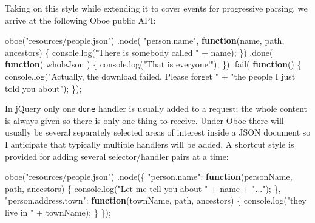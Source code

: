 \documentclass[]{article}
\newenvironment{Shaded}{}{}
\newcommand{\KeywordTok}[1]{\textcolor[rgb]{0.00,0.44,0.13}{\textbf{{#1}}}}
\newcommand{\StringTok}[1]{\textcolor[rgb]{0.25,0.44,0.63}{{#1}}}
\newcommand{\OtherTok}[1]{\textcolor[rgb]{0.00,0.44,0.13}{{#1}}}
\newcommand{\FunctionTok}[1]{\textcolor[rgb]{0.02,0.16,0.49}{{#1}}}
\newcommand{\NormalTok}[1]{{#1}}
\begin{document}
Taking on this style while extending it to cover events for progressive
parsing, we arrive at the following Oboe public API:

\begin{Shaded}
\begin{Highlighting}[]
\FunctionTok{oboe}\NormalTok{(}\StringTok{"resources/people.json"}\NormalTok{)}
   \NormalTok{.}\FunctionTok{node}\NormalTok{( }\StringTok{"person.name"}\NormalTok{, }\KeywordTok{function}\NormalTok{(name, path, ancestors) \{}
      \OtherTok{console}\NormalTok{.}\FunctionTok{log}\NormalTok{(}\StringTok{"There is somebody called "} \NormalTok{+ name);   }
   \NormalTok{\})}
   \NormalTok{.}\FunctionTok{done}\NormalTok{( }\KeywordTok{function}\NormalTok{( wholeJson ) \{}
      \OtherTok{console}\NormalTok{.}\FunctionTok{log}\NormalTok{(}\StringTok{"That is everyone!"}\NormalTok{);}
   \NormalTok{\})}
   \NormalTok{.}\FunctionTok{fail}\NormalTok{( }\KeywordTok{function}\NormalTok{() \{}
      \OtherTok{console}\NormalTok{.}\FunctionTok{log}\NormalTok{(}\StringTok{"Actually, the download failed. Please forget "} \NormalTok{+ }
                  \StringTok{"the people I just told you about"}\NormalTok{);}
   \NormalTok{\});}
\end{Highlighting}
\end{Shaded}

In jQuery only one \texttt{done} handler is usually added to a request;
the whole content is always given so there is only one thing to receive.
Under Oboe there will usually be several separately selected areas of
interest inside a JSON document so I anticipate that typically multiple
handlers will be added. A shortcut style is provided for adding several
selector/handler pairs at a time:

\begin{Shaded}
\begin{Highlighting}[]
\FunctionTok{oboe}\NormalTok{(}\StringTok{"resources/people.json"}\NormalTok{)}
   \NormalTok{.}\FunctionTok{node}\NormalTok{(\{  }
      \StringTok{"person.name"}\NormalTok{: }\KeywordTok{function}\NormalTok{(personName, path, ancestors) \{}
         \OtherTok{console}\NormalTok{.}\FunctionTok{log}\NormalTok{(}\StringTok{"Let me tell you about "} \NormalTok{+ name + }\StringTok{"..."}\NormalTok{);}
      \NormalTok{\},}
      \StringTok{"person.address.town"}\NormalTok{: }\KeywordTok{function}\NormalTok{(townName, path, ancestors) \{}
         \OtherTok{console}\NormalTok{.}\FunctionTok{log}\NormalTok{(}\StringTok{"they live in "} \NormalTok{+ townName);}
      \NormalTok{\}}
   \NormalTok{\});}
\end{Highlighting}
\end{Shaded}
\end{document}

